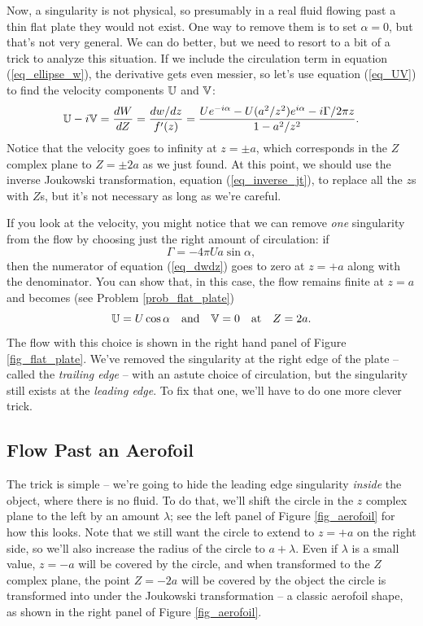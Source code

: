 Now, a singularity is not physical, so presumably in a real fluid flowing past a thin flat plate they would not exist.  One way to remove them is to set $\alpha = 0$, but that's not very general.  We can do better, but we need to resort to a bit of a trick to analyze this situation.  If we include the circulation term in equation (\ref{eq_ellipse_w}), the derivative gets even messier, so let's use equation (\ref{eq_UV}) to find the velocity components $\mathbb{U}$ and $\mathbb{V}$:
\begin{equation}
\label{eq_dwdz}
\mathbb{U} - i\mathbb{V} = \frac{dW}{dZ} = \frac{dw/dz}{f'(z)} = \frac{Ue^{-i\alpha} - U(a^2/z^2) e^{i\alpha} - i\Gamma/2\pi z}{1 - a^2/z^2}.
\end{equation}
Notice that the velocity goes to infinity at $z = \pm a$, which corresponds in the $Z$ complex plane to $Z = \pm 2a$ as we just found.  At this point, we should use the inverse Joukowski transformation, equation (\ref{eq_inverse_jt}), to replace all the $z$s with $Z$s, but it's not necessary as long as we're careful.

If you look at the velocity, you might notice that we can remove \emph{one} singularity from the flow by choosing just the right amount of circulation:  if 
\begin{equation}
\Gamma = -4\pi Ua \sin \alpha,
\end{equation}
then the numerator of equation (\ref{eq_dwdz}) goes to zero at $z = +a$ along with the denominator.  You can show that, in this case, the flow remains finite at $z = a$ and becomes (see Problem \ref{prob_flat_plate})
\begin{equation}
\mathbb{U} = U\cos\alpha \quad \text{and} \quad \mathbb{V} = 0 \quad \text{at} \quad Z = 2a.
\end{equation}
The flow with this choice is shown in the right hand panel of Figure \ref{fig_flat_plate}. We've removed the singularity at the right edge of the plate -- called the \emph{trailing edge} -- with an astute choice of circulation, but the singularity still exists at the \emph{leading edge}.  To fix that one, we'll have to do one more clever trick.





\subsection{Flow Past an Aerofoil}

The trick is simple -- we're going to hide the leading edge singularity \emph{inside} the object, where there is no fluid.  To do that, we'll shift the circle in the $z$ complex plane to the left by an amount $\lambda$; see the left panel of Figure \ref{fig_aerofoil} for how this looks. Note that we still want the circle to extend to $z=+a$ on the right side, so we'll also increase the radius of the circle to $a + \lambda$.  Even if $\lambda$ is a small value, $z=-a$ will be covered by the circle, and when transformed to the $Z$ complex plane, the point $Z = -2a$ will be covered by the object the circle is transformed into under the Joukowski transformation -- a classic aerofoil shape, as shown in the right panel of Figure \ref{fig_aerofoil}.

